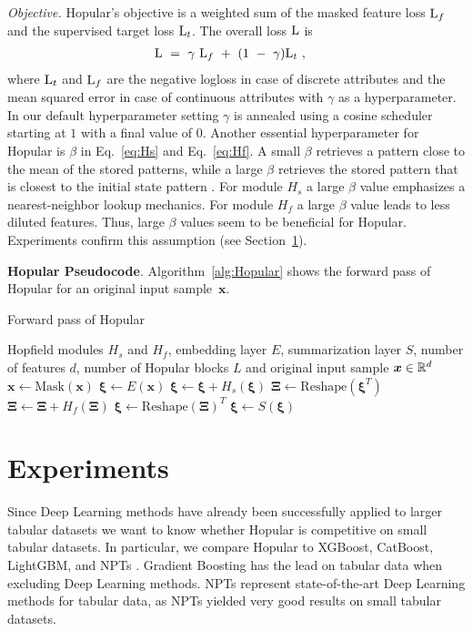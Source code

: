 \documentclass{article}
\theoremstyle{plain}
\theoremstyle{definition}
\theoremstyle{remark}
\newcommand\Bx{\bm{x}}
\newcommand\Bxi{\bm{\xi}}
\newcommand\BXi{\bm{\Xi}}
\begin{document}
{\em Objective.}
Hopular's objective is a weighted sum of the masked 
feature loss $\mathrm{L}_f$ 
and the supervised target loss $\mathrm{L}_t$.
The overall loss $\mathrm{L}$ is
\begin{align}\label{eq:total_loss}
    \mathrm{L} \ &= \ \gamma \ \mathrm{L}_f \ + \  (1 \ - \ \gamma) \mathrm{L}_t \ ,
\end{align}
where $\mathrm{L}_t$ and $\mathrm{L}_f$ are the negative logloss 
in case of discrete attributes and the mean squared error 
in case of continuous attributes with $\gamma$ as a hyperparameter. 
In our default hyperparameter setting $\gamma$ is
annealed using a cosine scheduler starting at $1$ with a final value of $0$.
Another essential hyperparameter for Hopular is $\beta$ 
in Eq.~\eqref{eq:Hs} and Eq.~\eqref{eq:Hf}.
A small $\beta$ retrieves a pattern close to the mean of
the stored patterns, while a large $\beta$ 
retrieves the stored pattern 
that is closest to the initial state pattern \citep{Ramsauer:21}.
For module $H_{s}$ a large $\beta$ value 
emphasizes a nearest-neighbor lookup mechanics.
For module $H_{f}$ a large $\beta$ value leads to less 
diluted features.
Thus, large $\beta$ values seem to be beneficial for Hopular.
Experiments confirm this assumption 
(see Section~\ref{sec:experiments}).

{\bf Hopular Pseudocode}. Algorithm~\ref{alg:Hopular} shows the forward pass of Hopular for
an original input sample~$\Bx$.

\begin{algorithm}[h]
   \caption{Forward pass of Hopular}
   \label{alg:Hopular}
\begin{algorithmic}[1]
   \Require Hopfield modules $H_s$ and $H_f$, embedding layer $E$,
   summarization layer $S$, number of features $d$, 
    number of Hopular blocks $L$
   and original input sample $\Bx \in \dR^d$
   \State $\Bx \gets \text{Mask}(\Bx)$
   \State $\Bxi \gets E(\Bx)$
   \State $\Bxi \gets \Bxi + H_s(\Bxi)$
   \State $\BXi \gets \text{Reshape}(\Bxi^{T})$
   \State $\BXi \gets \BXi + H_f(\BXi)$
   \State $\Bxi \gets \text{Reshape}(\BXi)^{T}$
   \EndFor
   \State $\Bxi \gets S(\Bxi)$
\end{algorithmic}
\end{algorithm}

\section{Experiments}
\label{sec:experiments}

Since Deep Learning methods have already been successfully applied to larger tabular datasets \citep{Avati:18,Simm:18,Zhang:19,Mayr:18}
we want to know whether Hopular 
is competitive on small tabular datasets. 
In particular, we compare Hopular to XGBoost, CatBoost, LightGBM, and NPTs \citep{Kossen:21}.
Gradient Boosting has the lead on tabular data when excluding Deep Learning methods.
NPTs represent state-of-the-art Deep Learning methods
for tabular data,
as NPTs yielded very good results on small tabular datasets.
\end{document}
